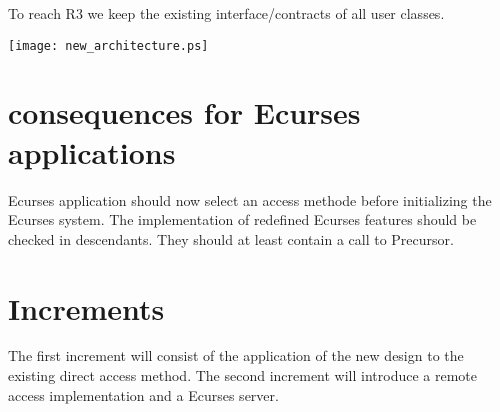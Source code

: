 \documentclass{article}
\begin{document}
To reach R3 we keep the existing interface/contracts of all user classes.


\texttt{[image: new\_architecture.ps]}




\section{consequences for Ecurses applications}
Ecurses application should now select an access methode before initializing the Ecurses system. The implementation of redefined Ecurses features should be checked in descendants. They should at least contain a call to Precursor.

\section{Increments}
The first increment will consist of the application of the new design to the existing direct access method.
The second increment will introduce a remote access implementation and a Ecurses server.
\end{document}
